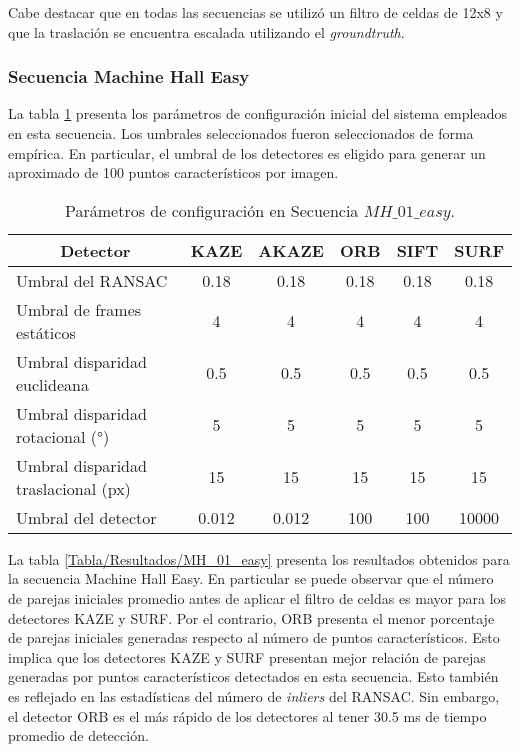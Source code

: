  Cabe destacar que en todas las secuencias se utilizó un filtro de celdas de 12x8 y que la traslación se encuentra escalada utilizando el \textit{groundtruth}.
 
\subsubsection{Secuencia Machine Hall Easy}


La tabla \ref{Tabla/Parametros/MH_01_easy} presenta los parámetros de configuración inicial del sistema empleados en esta secuencia. Los umbrales seleccionados fueron seleccionados de forma empírica. En particular, el umbral de los detectores es eligido para generar un aproximado de 100 puntos característicos por imagen.

\begin{table}[H]
	\caption{Parámetros de configuración en Secuencia $MH\_ 01\_ easy$.}
	\begin{tabular}{|l|c|c|c|c|c|}
		\hline
		\multicolumn{1}{|c|}{\textbf{Detector}} & \textbf{KAZE} & \textbf{AKAZE} & \textbf{ORB} & \textbf{SIFT} & \textbf{SURF} \\ \hline
		Umbral del RANSAC & 0.18 & 0.18 & 0.18 & 0.18 & 0.18 \\ \hline
		Umbral de frames estáticos & 4 & 4 & 4 & 4 & 4 \\ \hline
		Umbral disparidad euclideana & 0.5 & 0.5 & 0.5 & 0.5 & 0.5 \\ \hline
		Umbral disparidad rotacional (°) & 5 & 5 & 5 & 5 & 5 \\ \hline
		Umbral disparidad traslacional (px) & 15 & 15 & 15 & 15 & 15 \\ \hline
		Umbral del detector & 0.012 & 0.012 & 100 & 100 & 10000 \\ \hline
	\end{tabular}
	\label{Tabla/Parametros/MH_01_easy}
\end{table}


La tabla \ref{Tabla/Resultados/MH_01_easy} presenta los resultados obtenidos para la secuencia Machine Hall Easy. En particular  se puede observar que el número de parejas iniciales  promedio antes de aplicar el filtro de celdas es mayor para los detectores KAZE y SURF. Por el contrario, ORB presenta el menor porcentaje de parejas iniciales generadas respecto al número de puntos característicos. Esto implica que los detectores KAZE y SURF presentan mejor relación de parejas generadas por puntos característicos detectados en esta secuencia. Esto también es reflejado en las estadísticas del número de \textit{inliers} del RANSAC.  Sin embargo, el detector ORB es el más rápido de los detectores al tener 30.5 ms de tiempo promedio de detección.

